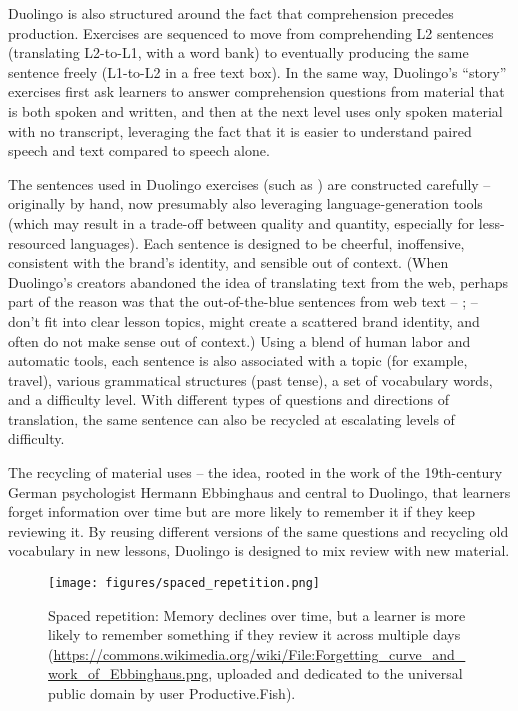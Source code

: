 Duolingo is also structured around the fact that comprehension precedes production.  Exercises are sequenced to move from comprehending L2 sentences (translating L2-to-L1, with a word bank) to eventually producing the same sentence freely (L1-to-L2 in a free text box).  In the same way, Duolingo's ``story'' exercises first ask learners to answer comprehension questions from material that is both spoken and written, and then at the next level uses only spoken material with no transcript, leveraging the fact that it is easier to understand paired speech and text compared to speech alone.



The sentences used in Duolingo exercises (such as ) are constructed carefully -- originally by hand, now presumably also leveraging language-generation tools (which may result in a trade-off between quality and quantity, especially for less-resourced languages).  Each sentence is designed to be cheerful, inoffensive, consistent with the brand's identity, and sensible out of context.  (When Duolingo's creators abandoned the idea of translating text from the web, perhaps part of the reason was that the out-of-the-blue sentences from web text  -- ;  -- don't fit into clear lesson topics, might create a scattered brand identity, and often do not make sense out of context.)   Using a blend of human labor and automatic tools, each sentence is also associated with a topic (for example, travel), various grammatical structures (past tense), a set of vocabulary words, and a difficulty level.  With different types of questions and directions of translation, the same sentence can also be recycled at escalating levels of difficulty. 

The recycling of material uses   -- the idea, rooted in the work of  the 19th-century German psychologist Hermann Ebbinghaus and central to Duolingo, that learners forget information over time but are more likely to remember it if they keep reviewing it.  By reusing different versions of the same questions and recycling old vocabulary in new lessons, Duolingo is designed to mix review with new material.


\begin{figure}
\texttt{[image: figures/spaced\_repetition.png]}
\caption{Spaced repetition: Memory declines over time, but a learner is more likely to remember something if they review it across multiple days
(\url{https://commons.wikimedia.org/wiki/File:Forgetting_curve_and_work_of_Ebbinghaus.png}, uploaded and dedicated to the universal public domain by user Productive.Fish).}
\end{figure}



